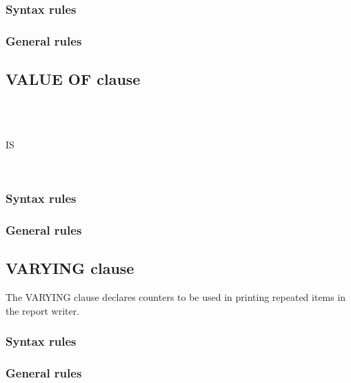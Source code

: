 \subsubsection{Syntax rules}

\subsubsection{General rules}

\subsection{VALUE OF clause}

\begin{syntax}[\deletedcolour]
   
  \begin{1=}
     \\
     \\
    \identifier
  \end{1=}
  IS
  \begin{1=}
    \literal \\
    \identifier
  \end{1=}
\end{syntax}

\subsubsection{Syntax rules}

\subsubsection{General rules}

\subsection{VARYING clause}

The VARYING clause declares counters to be used in printing repeated items in the report writer.

\begin{syntax}
   \identifier {}   
\end{syntax}

\subsubsection{Syntax rules}

\subsubsection{General rules}

